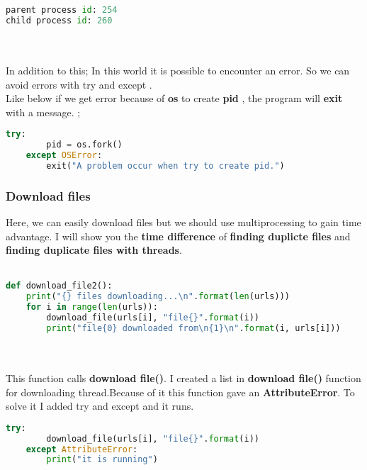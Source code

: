 \documentclass[onecolumn]{article}
\begin{document}
\begin{lstlisting}[language=Python, caption= Output]
parent process id: 254
child process id: 260
\end{lstlisting} \\ \\

In addition to this; In this world it is possible to encounter an error. So we can avoid errors with try and except . \\
Like below if we get error because of\textbf{ os} to create\textbf{ pid} , the program will \textbf{exit} with a message. ;

\begin{lstlisting}[language=Python, caption= Output]
try:
		pid = os.fork()
	except OSError:
		exit("A problem occur when try to create pid.")
\end{lstlisting}


\subsubsection{Download files }
Here, we can easily download files but we should use multiprocessing to gain time advantage. I will show you the \textbf{time difference} of \textbf{finding duplicte files} and \textbf{finding duplicate files with threads}.\\ \\

\begin{lstlisting}[language=Python, caption= Downloading files ]
def download_file2():
    print("{} files downloading...\n".format(len(urls)))
    for i in range(len(urls)):
        download_file(urls[i], "file{}".format(i))
        print("file{0} downloaded from\n{1}\n".format(i, urls[i]))
\end{lstlisting} \\ \\

  This function calls \textbf{download file()}.  I created a list in \textbf{download file()} function for downloading thread.Because of it this function gave an 
\textbf{AttributeError}. To solve it I added try and except and it runs.


\begin{lstlisting}[language=Python, caption= Try - Except]
    try:
        download_file(urls[i], "file{}".format(i))
    except AttributeError:
        print("it is running")
\end{lstlisting} \\ \\
\end{document}
